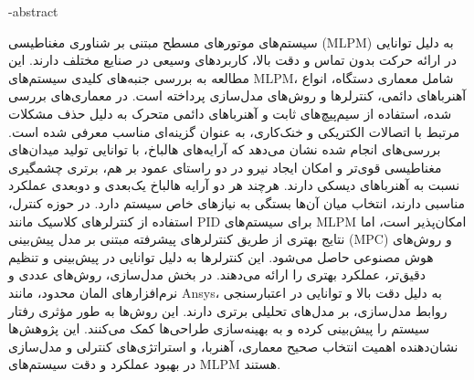 %
\fa-abstract{
سیستم‌های موتورهای مسطح مبتنی بر شناوری مغناطیسی (MLPM) به دلیل توانایی در ارائه حرکت بدون تماس و دقت بالا، کاربردهای وسیعی در صنایع مختلف دارند. این مطالعه به بررسی جنبه‌های کلیدی سیستم‌های MLPM، شامل معماری دستگاه، انواع آهنرباهای دائمی، کنترلرها و روش‌های مدل‌سازی پرداخته است.
در معماری‌های بررسی شده، استفاده از سیم‌پیچ‌های ثابت و آهنرباهای دائمی متحرک به دلیل حذف مشکلات مرتبط با اتصالات الکتریکی و خنک‌کاری، به عنوان گزینه‌ای مناسب معرفی شده است. بررسی‌های انجام شده نشان می‌دهد که آرایه‌های هالباخ، با توانایی تولید میدان‌های مغناطیسی قوی‌تر و امکان ایجاد نیرو در دو راستای عمود بر هم، برتری چشمگیری نسبت به آهنرباهای دیسکی دارند. هرچند هر دو آرایه هالباخ یک‌بعدی و دوبعدی عملکرد مناسبی دارند، انتخاب میان آن‌ها بستگی به نیازهای خاص سیستم دارد.
در حوزه کنترل، استفاده از کنترلرهای کلاسیک مانند PID برای سیستم‌های MLPM امکان‌پذیر است، اما نتایج بهتری از طریق کنترلرهای پیشرفته مبتنی بر مدل پیش‌بینی (MPC) و روش‌های هوش مصنوعی حاصل می‌شود. این کنترلرها به دلیل توانایی در پیش‌بینی و تنظیم دقیق‌تر، عملکرد بهتری را ارائه می‌دهند.
در بخش مدل‌سازی، روش‌های عددی و نرم‌افزارهای المان محدود، مانند Ansys، به دلیل دقت بالا و توانایی در اعتبارسنجی روابط مدل‌سازی، بر مدل‌های تحلیلی برتری دارند. این روش‌ها به طور مؤثری رفتار سیستم را پیش‌بینی کرده و به بهینه‌سازی طراحی‌ها کمک می‌کنند.
این پژوهش‌ها نشان‌دهنده اهمیت انتخاب صحیح معماری، آهنربا، و استراتژی‌های کنترلی و مدل‌سازی در بهبود عملکرد و دقت سیستم‌های MLPM هستند.

}
